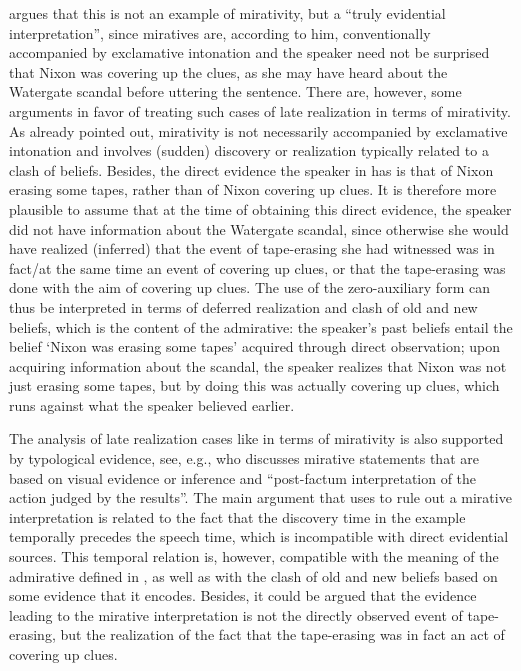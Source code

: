\documentclass[output=paper,
colorlinks,
citecolor=brown,
newtxmath
]{langscibook}
\begin{document}
\noindent \citet[4]{Koev2017} argues that this is not an example of mirativity, but a ``truly evidential interpretation'', since miratives are, according to him, conventionally accompanied by exclamative intonation and the speaker need not be surprised that Nixon was covering up the clues, as she may have heard about the Watergate scandal before uttering the sentence.
There are, however, some arguments in favor of treating such cases of late realization in terms of mirativity. As already pointed out, mirativity is not necessarily accompanied by exclamative intonation and involves (sudden) discovery or realization typically related to a clash of beliefs.
Besides, the direct evidence the speaker in  has is that of Nixon erasing some tapes, rather than of Nixon covering up clues. It is therefore more plausible to assume that at the time of obtaining this direct evidence, the speaker did not have information about the Watergate scandal, since otherwise she would have realized (inferred) that the event of tape-erasing she had witnessed was in fact/at the same time an event of covering up clues, or that the tape-erasing was done with the aim of covering up clues.
The use of the zero-auxiliary form can thus be interpreted in terms of deferred realization and clash of old and new beliefs, which is the content of the admirative: the speaker's past beliefs entail the belief `Nixon was erasing some tapes' acquired through direct observation; upon acquiring information about the scandal, the speaker realizes that Nixon was not just erasing some tapes, but by doing this was actually covering up clues, which runs against what the speaker believed earlier.

The analysis of late realization cases like  in terms of mirativity is also supported by typological evidence, see, e.g., \cite[441]{Aikhenvald2012} who discusses mirative statements that are based on visual evidence or inference and ``post-factum interpretation of the action judged by the results''.
The main argument that \citeauthor{Koev2017} uses to rule out a mirative interpretation is related to the fact that the discovery time in the example temporally precedes the speech time, which is incompatible with direct evidential sources. This temporal relation is, however, compatible with the meaning of the admirative defined in , as well as with the clash of old and new beliefs based on some evidence that it encodes. Besides, it could be argued that the evidence leading to the mirative interpretation is not the directly observed event of tape-erasing, but the realization of the fact that the tape-erasing was in fact an act of covering up clues.
\end{document}
